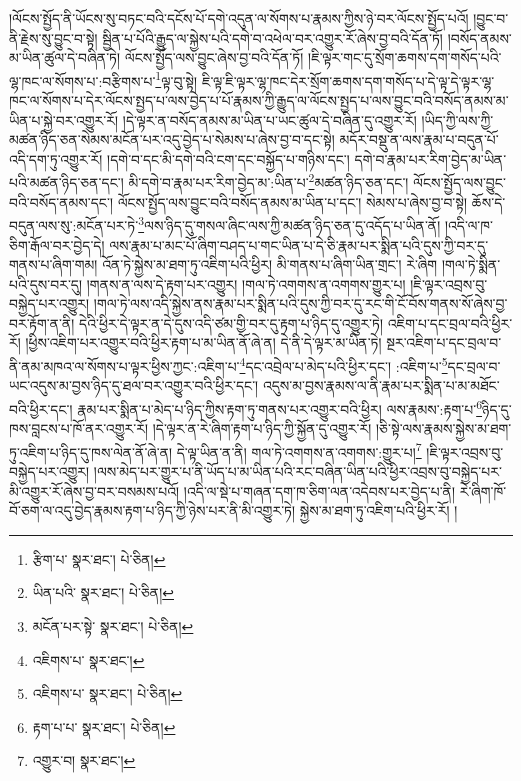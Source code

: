 །ལོངས་སྤྱོད་ནི་ཡོངས་སུ་བཏང་བའི་དངོས་པོ་དགེ་འདུན་ལ་སོགས་པ་རྣམས་ཀྱིས་ཉེ་བར་ལོངས་སྤྱོད་པའོ། །བྱུང་བ་ནི་རྗེས་སུ་བྱུང་བ་སྟེ། སྦྱིན་པ་པོའི་རྒྱུད་ལ་སྐྱེས་པའི་དགེ་བ་འཕེལ་བར་འགྱུར་རོ་ཞེས་བྱ་བའི་དོན་ཏོ། །བསོད་ནམས་མ་ཡིན་ཚུལ་དེ་བཞིན་ཏེ། ལོངས་སྤྱོད་ལས་བྱུང་ཞེས་བྱ་བའི་དོན་ཏོ། །ཇི་ལྟར་གང་དུ་སྲོག་ཆགས་དག་གསོད་པའི་ལྷ་ཁང་ལ་སོགས་པ་:བརྩིགས་པ་\footnote{རྩིག་པ་  སྣར་ཐང་།  པེ་ཅིན། }ལྟ་བུ་སྟེ། ཇི་ལྟ་ཇི་ལྟར་ལྷ་ཁང་དེར་སྲོག་ཆགས་དག་གསོད་པ་དེ་ལྟ་དེ་ལྟར་ལྷ་ཁང་ལ་སོགས་པ་དེར་ལོངས་སྤྱད་པ་ལས་བྱེད་པ་པོ་རྣམས་ཀྱི་རྒྱུད་ལ་ལོངས་སྤྱད་པ་ལས་བྱུང་བའི་བསོད་ནམས་མ་ཡིན་པ་སྐྱེ་བར་འགྱུར་རོ། །དེ་ལྟར་ན་བསོད་ནམས་མ་ཡིན་པ་ཡང་ཚུལ་དེ་བཞིན་དུ་འགྱུར་རོ། །ཡིད་ཀྱི་ལས་ཀྱི་མཚན་ཉིད་ཅན་སེམས་མངོན་པར་འདུ་བྱེད་པ་སེམས་པ་ཞེས་བྱ་བ་དང་སྟེ། མདོར་བསྡུ་ན་ལས་རྣམ་པ་བདུན་པོ་འདི་དག་ཏུ་འགྱུར་རོ། །དགེ་བ་དང་མི་དགེ་བའི་ངག་དང་བསྐྱོད་པ་གཉིས་དང་། དགེ་བ་རྣམ་པར་རིག་བྱེད་མ་ཡིན་པའི་མཚན་ཉིད་ཅན་དང་། མི་དགེ་བ་རྣམ་པར་རིག་བྱེད་མ་:ཡིན་པ་\footnote{ཡིན་པའི་  སྣར་ཐང་།  པེ་ཅིན། }མཚན་ཉིད་ཅན་དང་། ལོངས་སྤྱོད་ལས་བྱུང་བའི་བསོད་ནམས་དང་། ལོངས་སྤྱོད་ལས་བྱུང་བའི་བསོད་ནམས་མ་ཡིན་པ་དང་། སེམས་པ་ཞེས་བྱ་བ་སྟེ། ཆོས་དེ་བདུན་ལས་སུ་:མངོན་པར་ཏེ་\footnote{མངོན་པར་སྟེ་  སྣར་ཐང་།  པེ་ཅིན། }ལས་ཉིད་དུ་གསལ་ཞིང་ལས་ཀྱི་མཚན་ཉིད་ཅན་དུ་འདོད་པ་ཡིན་ནོ། །འདི་ལ་ཁ་ཅིག་རྒོལ་བར་བྱེད་དེ། ལས་རྣམ་པ་མང་པོ་ཞིག་བཤད་པ་གང་ཡིན་པ་དེ་ཅི་རྣམ་པར་སྨིན་པའི་དུས་ཀྱི་བར་དུ་གནས་པ་ཞིག་གམ། འོན་ཏེ་སྐྱེས་མ་ཐག་ཏུ་འཇིག་པའི་ཕྱིར། མི་གནས་པ་ཞིག་ཡིན་གྲང་། རེ་ཞིག །གལ་ཏེ་སྨིན་པའི་དུས་བར་དུ། །གནས་ན་ལས་དེ་རྟག་པར་འགྱུར། །གལ་ཏེ་འགགས་ན་འགགས་གྱུར་པ། །ཇི་ལྟར་འབྲས་བུ་བསྐྱེད་པར་འགྱུར། །གལ་ཏེ་ལས་འདི་སྐྱེས་ནས་རྣམ་པར་སྨིན་པའི་དུས་ཀྱི་བར་དུ་རང་གི་ངོ་བོས་གནས་སོ་ཞེས་བྱ་བར་རྟོག་ན་ནི། དེའི་ཕྱིར་དེ་ལྟར་ན་དེ་དུས་འདི་ཙམ་གྱི་བར་དུ་རྟག་པ་ཉིད་དུ་འགྱུར་ཏེ། འཇིག་པ་དང་བྲལ་བའི་ཕྱིར་རོ། །ཕྱིས་འཇིག་པར་འགྱུར་བའི་ཕྱིར་རྟག་པ་མ་ཡིན་ནོ་ཞེ་ན། དེ་ནི་དེ་ལྟར་མ་ཡིན་ཏེ། སྔར་འཇིག་པ་དང་བྲལ་བ་ནི་ནམ་མཁའ་ལ་སོགས་པ་ལྟར་ཕྱིས་ཀྱང་:འཇིག་པ་\footnote{འཇིགས་པ་  སྣར་ཐང་། }དང་འབྲེལ་པ་མེད་པའི་ཕྱིར་དང་། :འཇིག་པ་\footnote{འཇིགས་པ་  སྣར་ཐང་།  པེ་ཅིན། }དང་བྲལ་བ་ཡང་འདུས་མ་བྱས་ཉིད་དུ་ཐལ་བར་འགྱུར་བའི་ཕྱིར་དང་། འདུས་མ་བྱས་རྣམས་ལ་ནི་རྣམ་པར་སྨིན་པ་མ་མཐོང་བའི་ཕྱིར་དང་། རྣམ་པར་སྨིན་པ་མེད་པ་ཉིད་ཀྱིས་རྟག་ཏུ་གནས་པར་འགྱུར་བའི་ཕྱིར། ལས་རྣམས་:རྟག་པ་\footnote{རྟག་པ་པ་  སྣར་ཐང་།  པེ་ཅིན། }ཉིད་དུ་ཁས་བླངས་པ་ཁོ་ནར་འགྱུར་རོ། །དེ་ལྟར་ན་རེ་ཞིག་རྟག་པ་ཉིད་ཀྱི་སྐྱོན་དུ་འགྱུར་རོ། །ཅི་སྟེ་ལས་རྣམས་སྐྱེས་མ་ཐག་ཏུ་འཇིག་པ་ཉིད་དུ་ཁས་ལེན་ནོ་ཞེ་ན། དེ་ལྟ་ཡིན་ན་ནི། གལ་ཏེ་འགགས་ན་འགགས་:གྱུར་པ།\footnote{འགྱུར་བ།  སྣར་ཐང་། } །ཇི་ལྟར་འབྲས་བུ་བསྐྱེད་པར་འགྱུར། །ལས་མེད་པར་གྱུར་པ་ནི་ཡོད་པ་མ་ཡིན་པའི་རང་བཞིན་ཡིན་པའི་ཕྱིར་འབྲས་བུ་བསྐྱེད་པར་མི་འགྱུར་རོ་ཞེས་བྱ་བར་བསམས་པའོ། །འདི་ལ་སྡེ་པ་གཞན་དག་ཁ་ཅིག་ལན་འདེབས་པར་བྱེད་པ་ནི། རེ་ཞིག་ཁོ་བོ་ཅག་ལ་འདུ་བྱེད་རྣམས་རྟག་པ་ཉིད་ཀྱི་ཉེས་པར་ནི་མི་འགྱུར་ཏེ། སྐྱེས་མ་ཐག་ཏུ་འཇིག་པའི་ཕྱིར་རོ། །
